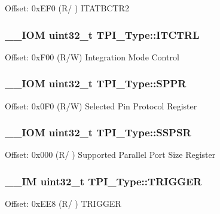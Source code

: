 Offset\-: 0x\-E\-F0 (R/ ) I\-T\-A\-T\-B\-C\-T\-R2 \hypertarget{struct_t_p_i___type_aaa4c823c10f115f7517c82ef86a5a68d}{
\subsubsection[{I\-T\-C\-T\-R\-L}]{\setlength{\rightskip}{0pt plus 5cm}\-\_\-\-\_\-\-I\-O\-M uint32\-\_\-t T\-P\-I\-\_\-\-Type\-::\-I\-T\-C\-T\-R\-L}}\label{struct_t_p_i___type_aaa4c823c10f115f7517c82ef86a5a68d}
Offset\-: 0x\-F00 (R/\-W) Integration Mode Control \hypertarget{struct_t_p_i___type_a12f79d4e3ddc69893ba8bff890d04cc5}{
\subsubsection[{S\-P\-P\-R}]{\setlength{\rightskip}{0pt plus 5cm}\-\_\-\-\_\-\-I\-O\-M uint32\-\_\-t T\-P\-I\-\_\-\-Type\-::\-S\-P\-P\-R}}\label{struct_t_p_i___type_a12f79d4e3ddc69893ba8bff890d04cc5}
Offset\-: 0x0\-F0 (R/\-W) Selected Pin Protocol Register \hypertarget{struct_t_p_i___type_a7b72598e20066133e505bb781690dc22}{
\subsubsection[{S\-S\-P\-S\-R}]{\setlength{\rightskip}{0pt plus 5cm}\-\_\-\-\_\-\-I\-O\-M uint32\-\_\-t T\-P\-I\-\_\-\-Type\-::\-S\-S\-P\-S\-R}}\label{struct_t_p_i___type_a7b72598e20066133e505bb781690dc22}
Offset\-: 0x000 (R/ ) Supported Parallel Port Size Register \hypertarget{struct_t_p_i___type_a4d4cd2357f72333a82a1313228287bbd}{
\subsubsection[{T\-R\-I\-G\-G\-E\-R}]{\setlength{\rightskip}{0pt plus 5cm}\-\_\-\-\_\-\-I\-M uint32\-\_\-t T\-P\-I\-\_\-\-Type\-::\-T\-R\-I\-G\-G\-E\-R}}\label{struct_t_p_i___type_a4d4cd2357f72333a82a1313228287bbd}
Offset\-: 0x\-E\-E8 (R/ ) T\-R\-I\-G\-G\-E\-R 

